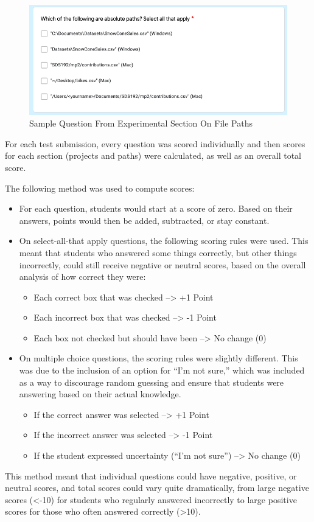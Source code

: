 \documentclass[12pt,twoside]{reedthesis}
\providecommand{\tightlist}{%
  \setlength{\itemsep}{0pt}\setlength{\parskip}{0pt}}
\begin{document}
\begin{figure}
\includegraphics[width=1\linewidth]{figure/paths-1} \caption{Sample Question From Experimental Section On File Paths}\label{fig:unnamed-chunk-65}
\end{figure}
For each test submission, every question was scored individually and then scores for each section (projects and paths) were calculated, as well as an overall total score.

The following method was used to compute scores:
\begin{itemize}
\item
  For each question, students would start at a score of zero. Based on their answers, points would then be added, subtracted, or stay constant.
\item
  On select-all-that apply questions, the following scoring rules were used. This meant that students who answered some things correctly, but other things incorrectly, could still receive negative or neutral scores, based on the overall analysis of how correct they were:
  \begin{itemize}
  \tightlist
  \item
    Each correct box that was checked --\textgreater{} +1 Point
  \item
    Each incorrect box that was checked --\textgreater{} -1 Point
  \item
    Each box not checked but should have been --\textgreater{} No change (0)
  \end{itemize}
\item
  On multiple choice questions, the scoring rules were slightly different. This was due to the inclusion of an option for ``I'm not sure,'' which was included as a way to discourage random guessing and ensure that students were answering based on their actual knowledge.
  \begin{itemize}
  \tightlist
  \item
    If the correct answer was selected --\textgreater{} +1 Point
  \item
    If the incorrect answer was selected --\textgreater{} -1 Point
  \item
    If the student expressed uncertainty (``I'm not sure'') --\textgreater{} No change (0)
  \end{itemize}
\end{itemize}
This method meant that individual questions could have negative, positive, or neutral scores, and total scores could vary quite dramatically, from large negative scores (\textless-10) for students who regularly answered incorrectly to large positive scores for those who often answered correctly (\textgreater10).
\end{document}
